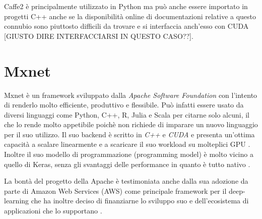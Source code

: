 Caffe2 è principalmente utilizzato in Python ma può anche essere importato in progetti C++ anche se la disponibilità online di documentazioni relative a questo connubio sono piuttosto difficili da trovare \cite{caffe_c++} e si interfaccia anch'esso con CUDA [GIUSTO DIRE INTERFACCIARSI IN QUESTO CASO??].

\section{Mxnet}
Mxnet è un framework sviluppato dalla \textit{Apache Software Foundation} con l'intento di renderlo molto efficiente, produttivo e flessibile. Può infatti essere usato da diversi linguaggi come Python, C++, R, Julia e Scala per citarne solo alcuni, il che lo rende molto appetibile poichè non richiede di imparare un nuovo linguaggio per il suo utilizzo. Il suo backend è scritto in \emph{C++} e \emph{CUDA} e presenta un'ottima capacità a scalare linearmente e a scaricare il suo workload su molteplici GPU \cite{maruti:mxnet}. Inoltre il suo modello di programmazione (programming model) è molto vicino a quello di Keras, senza gli svantaggi delle performance in quanto è tutto nativo \cite{quora:mxnet}.

La bontà del progetto della Apache è testimoniata anche dalla sua adozione da parte di Amazon Web Services (AWS) come principale framework per il deep-learning che ha inoltre deciso di finanziarne lo sviluppo suo e dell'ecosistema di applicazioni che lo supportano \cite{}. 
